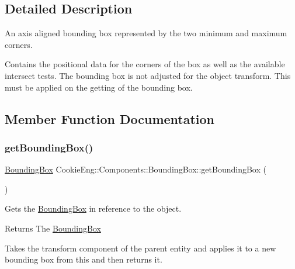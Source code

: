 \subsection{Detailed Description}
An axis aligned bounding box represented by the two minimum and maximum corners. 

Contains the positional data for the corners of the box as well as the available intersect tests. The bounding box is not adjusted for the object transform. This must be applied on the getting of the bounding box. 

\subsection{Member Function Documentation}
\mbox{\label{class_cookie_eng_1_1_components_1_1_bounding_box_a7eae87eceb357b5b29081e854f0dd790}} 
\subsubsection{\texorpdfstring{get\+Bounding\+Box()}{getBoundingBox()}}
{\footnotesize\ttfamily \hyperlink{class_cookie_eng_1_1_components_1_1_bounding_box}{Bounding\+Box} Cookie\+Eng\+::\+Components\+::\+Bounding\+Box\+::get\+Bounding\+Box (\begin{DoxyParamCaption}{ }\end{DoxyParamCaption})}



Gets the \hyperlink{class_cookie_eng_1_1_components_1_1_bounding_box}{Bounding\+Box} in reference to the object. 

\begin{DoxyReturn}{Returns}
The \hyperlink{class_cookie_eng_1_1_components_1_1_bounding_box}{Bounding\+Box}
\end{DoxyReturn}
Takes the transform component of the parent entity and applies it to a new bounding box from this and then returns it. \mbox{\label{class_cookie_eng_1_1_components_1_1_bounding_box_a259683b1838bb58a3ca3704bdb4fb268}} 
